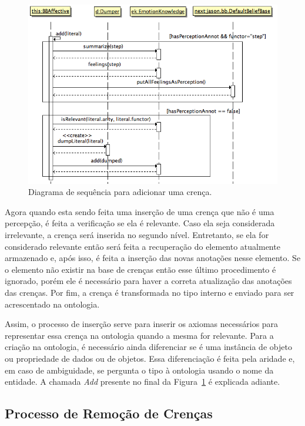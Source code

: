 \begin{figure}
  \centering
  \includegraphics[width=12cm]{figuras/addB.png}
  \caption{Diagrama de sequência para adicionar uma crença.}
  \label{fig:addBelief}
\end{figure}

Agora quando esta sendo feita uma inserção de uma crença que não é uma
percepção, é feita a verificação se ela é relevante. Caso ela seja considerada
irrelevante, a crença será inserida no segundo nível. Entretanto, se ela for
considerado relevante então será feita a recuperação do elemento atualmente
armazenado e, após isso, é feita a inserção das novas anotações nesse
elemento. Se o elemento não existir na base de crenças então esse último
procedimento é ignorado, porém ele é necessário para haver a correta
atualização das anotações das crenças. Por fim, a crença é transformada no
tipo interno e enviado para ser acrescentado na ontologia.

Assim, o processo de inserção serve para inserir os axiomas necessários para
representar essa crença na ontologia quando a mesma for relevante. Para a
criação na ontologia, é necessário ainda diferenciar se é uma instância de
objeto ou propriedade de dados ou de objetos. Essa diferenciação é feita pela
aridade e, em caso de ambiguidade, se pergunta o tipo à ontologia usando o
nome da entidade. A chamada \emph{Add} presente no final da
Figura~\ref{fig:addBelief} é explicada adiante.

\vfill

\subsection{Processo de Remoção de Crenças}

